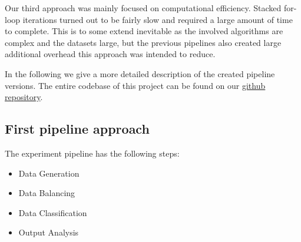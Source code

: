 Our third approach was mainly focused on computational efficiency. 
Stacked for-loop iterations turned out to be fairly slow and required a large amount of time to complete.
This is to some extend inevitable as the involved algorithms are complex and the datasets large, 
but the previous pipelines also created large additional overhead this approach was intended to reduce.

In the following we give a more detailed description of the created pipeline versions.
The entire codebase of this project can be found on our \href{https://github.com/gnthr-solve/TP_ML_Pipeline}{github repository}.

\subsection{First pipeline approach}

The experiment pipeline has the following steps:

\begin{itemize}
\item
  Data Generation
\item
  Data Balancing
\item
  Data Classification
\item
  Output Analysis
\end{itemize}

